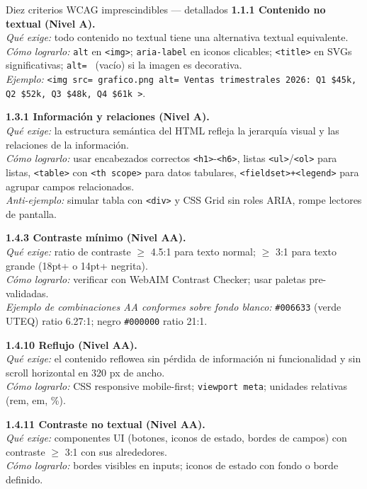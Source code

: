 \documentclass[11pt,a4paper,openany]{book}
\begin{document}
\begin{cajabuenas}{Diez criterios WCAG imprescindibles --- detallados}
\textbf{1.1.1 Contenido no textual (Nivel A).}\\
\emph{Qué exige:} todo contenido no textual tiene una alternativa
textual equivalente.\\
\emph{Cómo lograrlo:} \texttt{alt} en \texttt{<img>};
\texttt{aria-label} en iconos clicables; \texttt{<title>} en SVGs
significativas; \texttt{alt=  } (vacío) si la imagen es decorativa.\\
\emph{Ejemplo:} \texttt{<img src= grafico.png  alt= Ventas
trimestrales 2026: Q1 \$45k, Q2 \$52k, Q3 \$48k, Q4 \$61k >}.

\textbf{1.3.1 Información y relaciones (Nivel A).}\\
\emph{Qué exige:} la estructura semántica del HTML refleja la
jerarquía visual y las relaciones de la información.\\
\emph{Cómo lograrlo:} usar encabezados correctos
\texttt{<h1>}-\texttt{<h6>}, listas \texttt{<ul>}/\texttt{<ol>} para
listas, \texttt{<table>} con \texttt{<th scope>} para datos
tabulares, \texttt{<fieldset>+<legend>} para agrupar campos
relacionados.\\
\emph{Anti-ejemplo:} simular tabla con \texttt{<div>} y CSS Grid sin
roles ARIA, rompe lectores de pantalla.

\textbf{1.4.3 Contraste mínimo (Nivel AA).}\\
\emph{Qué exige:} ratio de contraste $\geq$ 4.5:1 para texto normal;
$\geq$ 3:1 para texto grande (18pt+ o 14pt+ negrita).\\
\emph{Cómo lograrlo:} verificar con WebAIM Contrast Checker; usar
paletas pre-validadas.\\
\emph{Ejemplo de combinaciones AA conformes sobre fondo blanco:}
\texttt{\#006633} (verde UTEQ) ratio 6.27:1; negro
\texttt{\#000000} ratio 21:1.

\textbf{1.4.10 Reflujo (Nivel AA).}\\
\emph{Qué exige:} el contenido reflowea sin pérdida de información ni
funcionalidad y sin scroll horizontal en 320 px de ancho.\\
\emph{Cómo lograrlo:} CSS responsive mobile-first;
\texttt{viewport meta}; unidades relativas (rem, em, \%).

\textbf{1.4.11 Contraste no textual (Nivel AA).}\\
\emph{Qué exige:} componentes UI (botones, iconos de estado, bordes
de campos) con contraste $\geq$ 3:1 con sus alrededores.\\
\emph{Cómo lograrlo:} bordes visibles en inputs; iconos de estado
con fondo o borde definido.


\end{cajabuenas}
\end{document}
